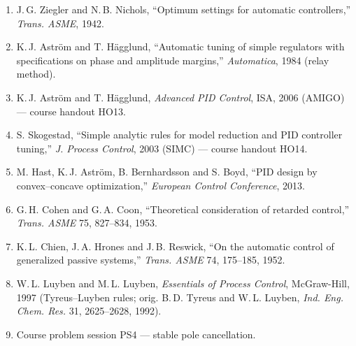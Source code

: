 \documentclass[11pt]{article}
\begin{document}

\begin{enumerate}[leftmargin=1.4em,itemsep=0.2em]
  \item J.\,G. Ziegler and N.\,B. Nichols, ``Optimum settings for automatic
        controllers,'' \emph{Trans. ASME}, 1942.
  \item K.\,J. Aström and T. Hägglund, ``Automatic tuning of simple
        regulators with specifications on phase and amplitude margins,''
        \emph{Automatica}, 1984 (relay method).
  \item K.\,J. Aström and T. Hägglund, \emph{Advanced PID Control}, ISA,
        2006 (AMIGO) --- course handout HO13.
  \item S. Skogestad, ``Simple analytic rules for model reduction and PID
        controller tuning,'' \emph{J. Process Control}, 2003 (SIMC) ---
        course handout HO14.
  \item M. Hast, K.\,J. Aström, B. Bernhardsson and S. Boyd, ``PID design by
        convex--concave optimization,'' \emph{European Control Conference},
        2013.
  \item G.\,H. Cohen and G.\,A. Coon, ``Theoretical consideration of retarded
        control,'' \emph{Trans. ASME} 75, 827--834, 1953.
  \item K.\,L. Chien, J.\,A. Hrones and J.\,B. Reswick, ``On the automatic
        control of generalized passive systems,'' \emph{Trans. ASME} 74,
        175--185, 1952.
  \item W.\,L. Luyben and M.\,L. Luyben, \emph{Essentials of Process Control},
        McGraw-Hill, 1997 (Tyreus--Luyben rules; orig. B.\,D. Tyreus and
        W.\,L. Luyben, \emph{Ind. Eng. Chem. Res.} 31, 2625--2628, 1992).
  \item Course problem session PS4 --- stable pole cancellation.
\end{enumerate}
\end{document}
